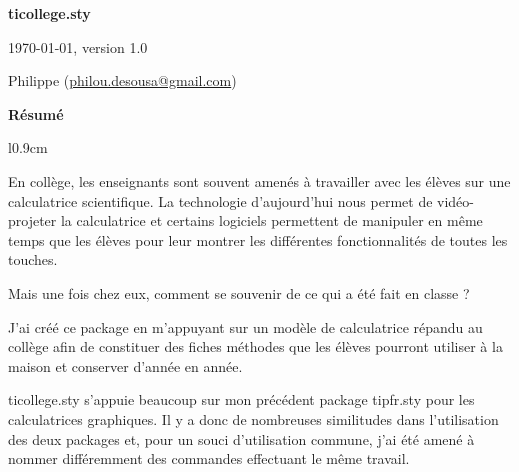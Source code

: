 \documentclass[10pt,french,a4paper]{article}
\begin{document}
\thispagestyle{empty}

\begin{center}
    \begin{tcolorbox}[enhanced,lifted shadow={1mm}{-2mm}{3mm}{0.1mm}{black!50!white},width=0.65\linewidth]
    \Huge\bfseries\centering ticollege.sty
    \end{tcolorbox}

    \TiCCalc[title=documentation]\bigskip

    \today, version 1.0\medskip

    Philippe  (\href{mailto:philou.desousa@gmail.com}{philou.desousa@gmail.com})
\end{center}

\begin{center}
    \small\bfseries
    Résumé
\end{center}

\begin{center}
    \begin{minipage}{0.9\linewidth}
    \small\parindent=15pt
    \begin{wrapfigure}{l}{0.9cm}
        \TiCCalc*
    \end{wrapfigure}
        En collège, les enseignants sont souvent amenés à travailler avec les élèves sur une calculatrice scientifique. La technologie d'aujourd'hui nous permet de vidéo-projeter la calculatrice et certains logiciels permettent de manipuler en même temps que les élèves pour leur montrer les différentes fonctionnalités de toutes les touches.\par\smallskip
        Mais une fois chez eux, comment se souvenir de ce qui a été fait en classe ?\par\smallskip
        J'ai créé ce package en m'appuyant sur un modèle de calculatrice répandu au collège afin de constituer des fiches méthodes que les élèves pourront utiliser à la maison et conserver d'année en année.\par
        \textsf{ticollege.sty} s'appuie beaucoup sur mon précédent package \textsf{tipfr.sty} pour les calculatrices graphiques. Il y a donc de nombreuses similitudes dans l'utilisation des deux packages et, pour un souci d'utilisation commune, j'ai été amené à nommer différemment des commandes effectuant le même travail.
    \end{minipage}
\end{center}\clearpage
\end{document}

